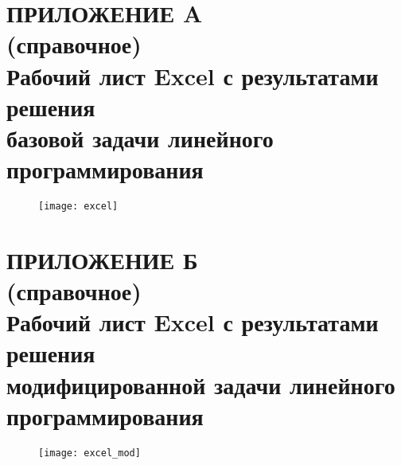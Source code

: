 \begin{landscape}
\section*{ПРИЛОЖЕНИЕ A \\ 
  (справочное) \\
  Рабочий лист Excel с результатами решения \\ базовой задачи линейного программирования}

\begin{figure}[h]
\centering
  \texttt{[image: excel]}
\end{figure}

\newpage

\section*{ПРИЛОЖЕНИЕ Б \\
  (справочное) \\
  Рабочий лист Excel с результатами решения \\ модифицированной задачи линейного программирования}

\begin{figure}[h]
\centering
  \texttt{[image: excel\_mod]}
\end{figure}


\end{landscape} 